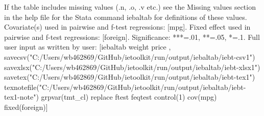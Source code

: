 If the table includes missing values (.n, .o, .v etc.) see the Missing values section in the help file for the Stata command iebaltab for definitions of these values. Covariate(s) used in pairwise and f-test regressions: [mpg]. Fixed effect used in pairwise and f-test regressions: [foreign]. Significance: ***=.01, **=.05, *=.1. Full user input as written by user: [iebaltab weight price , savecsv("C:/Users/wb462869/GitHub/ietoolkit/run/output/iebaltab/iebt-csv1") savexlsx("C:/Users/wb462869/GitHub/ietoolkit/run/output/iebaltab/iebt-xlsx1") savetex("C:/Users/wb462869/GitHub/ietoolkit/run/output/iebaltab/iebt-tex1") texnotefile("C:/Users/wb462869/GitHub/ietoolkit/run/output/iebaltab/iebt-tex1-note") grpvar(tmt\_cl) replace ftest feqtest control(1) cov(mpg) fixed(foreign)]
